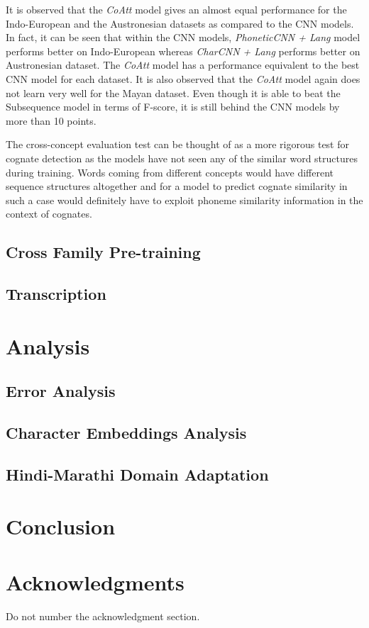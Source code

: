 \documentclass[11pt,letterpaper]{article}
\begin{document}
It is observed that the \textit{CoAtt} model gives an almost equal performance for the Indo-European and the Austronesian datasets as compared to the CNN models. In fact, it can be seen that within the CNN models, \textit{PhoneticCNN + Lang} model performs better on Indo-European whereas \textit{CharCNN + Lang} performs better on Austronesian dataset. The \textit{CoAtt} model has a performance equivalent to the best CNN model for each dataset. It is also observed that the \textit{CoAtt} model again does not learn very well for the Mayan dataset. Even though it is able to beat the Subsequence model in terms of F-score, it is still behind the CNN models by more than 10 points.

The cross-concept evaluation test can be thought of as a more rigorous test for cognate detection as the models have not seen any of the similar word structures during training. Words coming from different concepts would have different sequence structures altogether and for a model to predict cognate similarity in such a case would definitely have to exploit phoneme similarity information in the context of cognates.

\subsection{Cross Family Pre-training}



\subsection{Transcription}



\section{Analysis}

\subsection{Error Analysis}

\subsection{Character Embeddings Analysis}

\subsection{Hindi-Marathi Domain Adaptation}


\section{Conclusion}


\section*{Acknowledgments}

Do not number the acknowledgment section.




\end{document}
